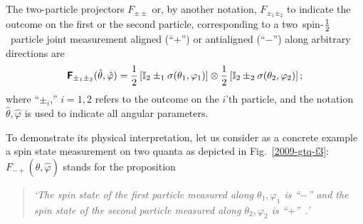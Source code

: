 {\begin{enumerate}
The two-particle projectors
$F_{\pm \pm }$ or, by another notation, $F_{\pm_1 \pm_2 }$ to indicate the outcome on the first or the second particle,
corresponding to a two~spin-${1\over 2}$~particle joint measurement
aligned (``$+$'') or antialigned  (``$-$'') along arbitrary directions are
\begin{equation}
  \textsf{\textbf{F}}_{\pm_1 \pm_2 } ({\hat \theta},{\hat \varphi} ) =
{\frac{1}{2}}\left[{\mathbb I}_2 \pm_1 {  \sigma}( \theta_1,\varphi_1 )\right]
\otimes
{\frac{1}{2}}\left[{\mathbb I}_2 \pm_2 { \sigma}( \theta_2,\varphi_2 )\right];
\label{2004-gtq-e2F2}
\end{equation}
where ``$\pm_i$,'' $i=1,2$ refers to the outcome on the $i$'th particle,
and the notation ${\hat \theta},{\hat \varphi}$ is used to indicate all angular parameters.

To demonstrate its physical interpretation, let us consider as a concrete example
a spin state measurement on two quanta as depicted in Fig.~\ref{2009-gtq-f3}:
$F_{- +  } ({\hat \theta},{\hat \varphi} )$ stands for the proposition
\begin{quote}
{\em `The spin state of the first particle measured along $\theta_1,\varphi_1$ is ``$-$''
      and
      the spin state of the second particle measured along $\theta_2,\varphi_2$ is ``$+$''~.'
}
\end{quote}


\end{enumerate}}
